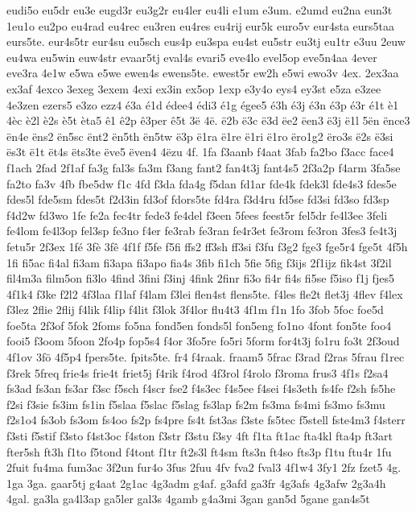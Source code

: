 {eudi5o
eu5dr
eu3e
eugd3r
eu3g2r
eu4ler
eu4li
e1um
e3um.
e2umd
eu2na
eun3t
1eu1o
eu2po
eu4rad
eu4rec
eu3ren
eu4res
eu4rij
eur5k
euro5v
eur4sta
eurs5taa
eurs5te.
eur4s5tr
eur4su
eu5sch
eus4p
eu3spa
eu4st
eu5str
eu3tj
eu1tr
e3uu
2euw
eu4wa
eu5win
euw4str
evaar5tj
eval4s
evari5
eve4lo
evel5op
eve5n4aa
4ever
eve3ra
4e1w
e5wa
e5we
ewen4s
ewens5te.
ewest5r
ew2h
e5wi
ewo3v
4ex.
2ex3aa
ex3af
4exco
3exeg
3exem
4exi
ex3in
ex5op
1exp
e3y4o
eys4
ey3st
e5za
e3zee
4e3zen
ezers5
e3zo
ezz4
é3a
é1d
édee4
édi3
é1g
égee5
é3h
é3j
é3n
é3p
é3r
é1t
è1
4èc
è2l
è2s
è5t
èta5
ê1
ê2p
ê3per
ê5t
3ë
4ë.
ë2b
ë3c
ë3d
ëe2
ëen3
ë3j
ë1l
5ën
ënce3
ën4e
ëns2
ën5sc
ënt2
ën5th
ën5tw
ë3p
ë1ra
ë1re
ë1ri
ë1ro
ëro1g2
ëro3s
ë2s
ë3si
ës3t
ë1t
ët4s
ëts3te
ëve5
ëven4
4ëzu
4f.
1fa
f3aanb
f4aat
3fab
fa2bo
f3acc
face4
f1ach
2fad
2f1af
fa3g
fal3s
fa3m
f3ang
fant2
fan4t3j
fant4s5
2f3a2p
f4arm
3fa5se
fa2to
fa3v
4fb
fbe5dw
f1c
4fd
f3da
fda4g
f5dan
fd1ar
fde4k
fdek3l
fde4s3
fdes5e
fdes5l
fde5sm
fdes5t
f2d3in
fd3of
fdors5te
fd4ra
f3d4ru
fd5se
fd3si
fd3so
fd3sp
f4d2w
fd3wo
1fe
fe2a
fec4tr
fede3
fe4del
f3een
5fees
feest5r
fel5dr
fe4l3ee
3feli
fe4lom
fe4l3op
fel3sp
fe3no
f4er
fe3rab
fe3ran
fe4r3et
fe3rom
fe3ron
3fes3
fe4t3j
fetu5r
2f3ex
1fé
3fè
3fê
4f1f
f5fe
f5fi
ffs2
ff3sh
ff3si
f3fu
f3g2
fge3
fge5r4
fge5t
4f5h
1fi
fi5ac
fi4al
fi3am
fi3apa
fi3apo
fia4s
3fib
fi1ch
5fie
5fig
f3ijs
2f1ijz
fik4st
3f2il
fil4m3a
film5on
fi3lo
4find
3fini
f3inj
4fink
2finr
fi3o
fi4r
fi4s
fi5se
f5iso
f1j
fjes5
4f1k4
f3ke
f2l2
4f3laa
f1laf
f4lam
f3lei
flen4st
flens5te.
f4les
fle2t
flet3j
4flev
f4lex
f3lez
2flie
2flij
f4lik
f4lip
f4lit
f3lok
3f4lor
flu4t3
4f1m
f1n
1fo
3fob
5foc
foe5d
foe5ta
2f3of
5fok
2foms
fo5na
fond5en
fonds5l
fon5eng
fo1no
4font
fon5te
foo4
fooi5
f3oom
5foon
2fo4p
fop5s4
f4or
3fo5re
fo5ri
5form
for4t3j
fo1ru
fo3t
2f3oud
4f1ov
3fö
4f5p4
fpers5te.
fpits5te.
fr4
f4raak.
fraam5
5frac
f3rad
f2ras
5frau
f1rec
f3rek
5freq
frie4s
frie4t
friet5j
f4rik
f4rod
4f3rol
f4rolo
f3roma
frus3
4f1s
f2sa4
fs3ad
fs3an
fs3ar
f3sc
f5sch
f4scr
fse2
f4s3ec
f4s5ee
f4sei
f4s3eth
fs4fe
f2sh
fs5he
f2si
f3sie
fs3im
fs1in
f5slaa
f5slac
f5slag
fs3lap
fs2m
fs3ma
fs4mi
fs3mo
fs3mu
f2s1o4
fs3ob
fs3om
fs4oo
fs2p
fs4pre
fs4t
fst3as
f3ste
fs5tec
f5stell
fste4m3
f4sterr
f3sti
f5stif
f3sto
f4st3oc
f4ston
f3str
f3stu
f3sy
4ft
f1ta
ft1ac
fta4kl
fta4p
ft3art
fter5sh
ft3h
f1to
f5tond
f4tont
f1tr
ft2s3l
ft4sm
fts3n
ft4so
fts3p
f1tu
ftu4r
1fu
2fuit
fu4ma
fum3ac
3f2un
fur4o
3fus
2fuu
4fv
fva2
fval3
4f1w4
3fy1
2fz
fzet5
4g.
1ga
3ga.
gaar5tj
g4aat
2g1ac
4g3adm
g4af.
g3afd
ga3fr
4g3afs
4g3afw
2g3a4h
4gal.
ga3la
ga4l3ap
ga5ler
gal3s
4gamb
g4a3mi
3gan
gan5d
5gane
gan4s5t
}

